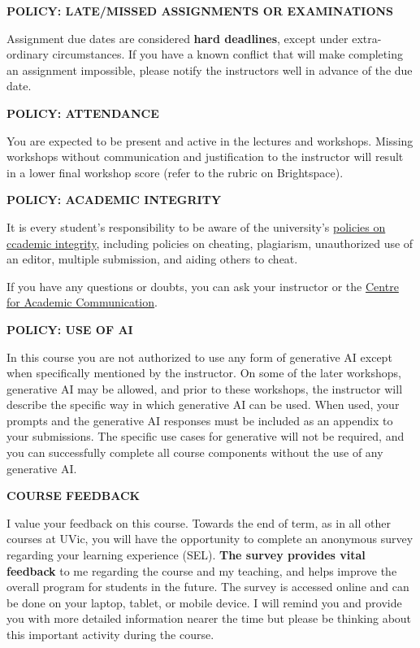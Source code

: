 \documentclass[11pt]{article}
\begin{document}
\textbf{POLICY: LATE/MISSED ASSIGNMENTS OR EXAMINATIONS}

Assignment due dates are considered \textbf{hard deadlines}, except under extra-ordinary circumstances. If you have a known conflict that will make completing an assignment impossible, please notify the instructors well in advance of the due date.

\textbf{POLICY: ATTENDANCE}

You are expected to be present and active in the lectures and workshops. Missing workshops without communication and justification to the instructor will result in a lower final workshop score (refer to the rubric on Brightspace).

\textbf{POLICY: ACADEMIC INTEGRITY}

It is every student's responsibility to be aware of the university's \href{https://web.uvic.ca/calendar/undergrad/info/regulations/academic-integrity.html}{policies on ccademic integrity}, including policies on cheating, plagiarism, unauthorized use of an editor, multiple submission, and aiding others to cheat.

If you have any questions or doubts, you can ask your instructor or the \href{https://uvic.ca/learningandteaching/cac}{Centre for Academic Communication}.


\textbf{POLICY: USE OF AI}

In this course you are not authorized to use any form of generative AI except when specifically mentioned by the instructor. On some of the later workshops, generative AI may be allowed, and prior to these workshops, the instructor will describe the specific way in which generative AI can be used. When used, your prompts and the generative AI responses must be included as an appendix to your submissions. The specific use cases for generative will not be required, and you can successfully complete all course components without the use of any generative AI.

\begin{center}
	\textbf{COURSE FEEDBACK}
\end{center}
\smallskip
\vspace*{-.6em}
I value your feedback on this course. Towards the end of term, as in all other courses at UVic, you will have the opportunity to complete an anonymous survey regarding your learning experience (SEL). \textbf{The survey provides vital feedback} to me regarding the course and my teaching, and helps improve the overall program for students in the future. The survey is accessed online and can be done on your laptop, tablet, or mobile device. I will remind you and provide you with more detailed information nearer the time but please be thinking about this important activity during the course.
\end{document}
